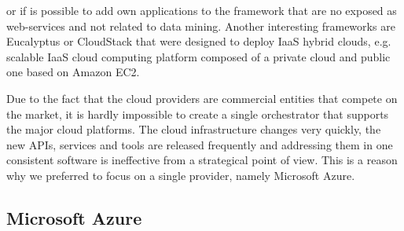 \documentclass[3p,times]{elsarticle}
\begin{document}
\begin{description}
or if is possible to add own applications to the framework that are no exposed as web-services and not related to data mining. 
Another interesting frameworks are Eucalyptus \cite{eucalyptus} or CloudStack \cite{CloudStack} that were designed to deploy IaaS hybrid clouds, e.g. scalable IaaS cloud computing platform composed of a private cloud and public one based on Amazon EC2.
\end{description}

Due to the fact that the cloud providers are commercial entities that compete on the market, it is hardly impossible to create a single orchestrator that supports the major cloud platforms. The cloud infrastructure changes very quickly, the new APIs, services and tools are released frequently and addressing them in one consistent software is ineffective from a strategical point of view. This is a reason why we preferred to focus on a single provider, namely Microsoft Azure.








\subsection{Microsoft Azure}
\end{document}
